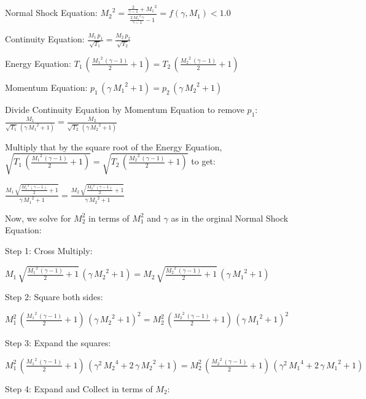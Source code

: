 \documentclass{article}
\begin{document}
Normal Shock Equation: ${M_2 }^2 = \frac{\frac{2}{\gamma -1}+{M_1 }^2 }{\frac{2\,{M_1 }^2 \,\gamma }{\gamma -1}-1} = f(\gamma, M_1) < 1.0$

Continuity Equation: $\frac{M_1 \,p_1 }{\sqrt{T_1 }}=\frac{M_2 \,p_2 }{\sqrt{T_2 }}$

Energy Equation: $T_1 \,{\left(\frac{{M_1 }^2 \,{\left(\gamma -1\right)}}{2}+1\right)}=T_2 \,{\left(\frac{{M_2 }^2 \,{\left(\gamma -1\right)}}{2}+1\right)}$

Momentum Equation: $p_1 \,{\left(\gamma \,{M_1 }^2 +1\right)}=p_2 \,{\left(\gamma \,{M_2 }^2 +1\right)}$

Divide Continuity Equation by Momentum Equation to remove $p_1$: $\frac{M_1 }{\sqrt{T_1 }\,{\left(\gamma \,{M_1 }^2 +1\right)}}=\frac{M_2 }{\sqrt{T_2 }\,{\left(\gamma \,{M_2 }^2 +1\right)}}$

Multiply that by the square root of the Energy Equation, $\sqrt{T_1 \,{\left(\frac{{M_1 }^2 \,{\left(\gamma -1\right)}}{2}+1\right)}}=\sqrt{T_2 \,{\left(\frac{{M_2 }^2 \,{\left(\gamma -1\right)}}{2}+1\right)}}$ to get:

$\frac{M_1 \,\sqrt{\frac{{M_1 }^2 \,{\left(\gamma -1\right)}}{2}+1}}{\gamma \,{M_1 }^2 +1}=\frac{M_2 \,\sqrt{\frac{{M_2 }^2 \,{\left(\gamma -1\right)}}{2}+1}}{\gamma \,{M_2 }^2 +1}$

Now, we solve for $M_2^2$ in terms of $M_1^2$ and $\gamma$ as in the orginal Normal Shock Equation:

Step 1: Cross Multiply:

$M_1 \,\sqrt{\frac{{M_1 }^2 \,{\left(\gamma -1\right)}}{2}+1}\,{\left(\gamma \,{M_2 }^2 +1\right)}=M_2 \,\sqrt{\frac{{M_2 }^2 \,{\left(\gamma -1\right)}}{2}+1}\,{\left(\gamma \,{M_1 }^2 +1\right)}$

Step 2: Square both sides:

$M_1^2 \,{\left(\frac{{M_1 }^2 \,{\left(\gamma -1\right)}}{2}+1\right)}\,{\left(\gamma \,{M_2 }^2 +1\right)}^2=M_2^2 \,{\left(\frac{{M_2 }^2 \,{\left(\gamma -1\right)}}{2}+1\right)}\,{\left(\gamma \,{M_1 }^2 +1\right)}^2$

Step 3: Expand the squares:

$M_1^2 \,{\left(\frac{{M_1 }^2 \,{\left(\gamma -1\right)}}{2}+1\right)}\,{\left(\gamma^2 \,{M_2 }^4 +2\,\gamma \,{M_2 }^2 +1\right)}=M_2^2 \,{\left(\frac{{M_2 }^2 \,{\left(\gamma -1\right)}}{2}+1\right)}\,{\left(\gamma^2 \,{M_1 }^4 +2\,\gamma \,{M_1 }^2 +1\right)}$

Step 4: Expand and Collect in terms of $M_2$:
\end{document}
